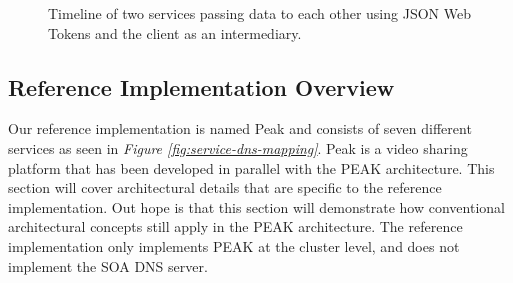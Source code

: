 \documentclass[12pt]{article}
\begin{document}
\newpage

\begin{figure}[h]
    \caption{Timeline of two services passing data to each other using JSON Web Tokens and the client as an intermediary.}
    \label{fig:JWTreq}
\end{figure}

\subsection{Reference Implementation Overview}
Our reference implementation is named Peak and consists of seven different services 
as seen in \textit{Figure \ref{fig:service-dns-mapping}}. Peak is a video sharing platform
that has been developed in parallel with the PEAK architecture. This section will 
cover architectural details that are specific to the reference implementation.
Out hope is that this section will demonstrate how conventional architectural concepts 
still apply in the PEAK architecture. The reference implementation only implements
PEAK at the cluster level, and does not implement the SOA DNS server.
\end{document}
